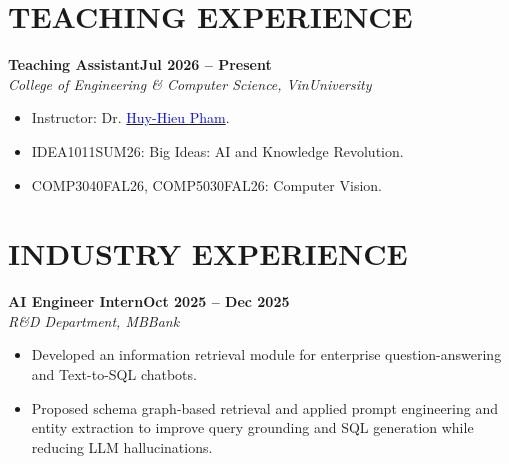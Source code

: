 \documentclass[11pt,a4paper]{article}
\newcommand{\smaller}{\small}
\newcommand{\heading}[2]{
  \noindent#1\hfill{\color{cvtextgray}#2}\\
}
\newcommand{\headingBf}[2]{
  \heading{\textbf{#1}}{\textbf{#2}}
}
\newcommand{\headingIt}[2]{
  \heading{\textit{#1}}{\textit{#2}}
}
\begin{document}
\section{TEACHING EXPERIENCE}
\headingBf{Teaching Assistant}{Jul 2026 -- Present}
\headingIt{College of Engineering \& Computer Science, VinUniversity}{}
\begin{itemize}
    \item Instructor: Dr. \href{https://huyhieupham.github.io/}{\textcolor{blue}{Huy-Hieu Pham}}.
    \item {IDEA1011SUM26}: Big Ideas: AI and Knowledge Revolution.
    \item {COMP3040FAL26, COMP5030FAL26}: Computer Vision.
\end{itemize}

\section{INDUSTRY EXPERIENCE}
\headingBf{AI Engineer Intern}{Oct 2025 -- Dec 2025}
\headingIt{R\&D Department, MBBank}{}
\begin{itemize}
\item Developed an information retrieval module for enterprise question-answering and Text-to-SQL chatbots.
\item Proposed schema graph-based retrieval and applied prompt engineering and entity extraction to improve query grounding and SQL generation while reducing LLM hallucinations.
\end{itemize}


\end{document}
